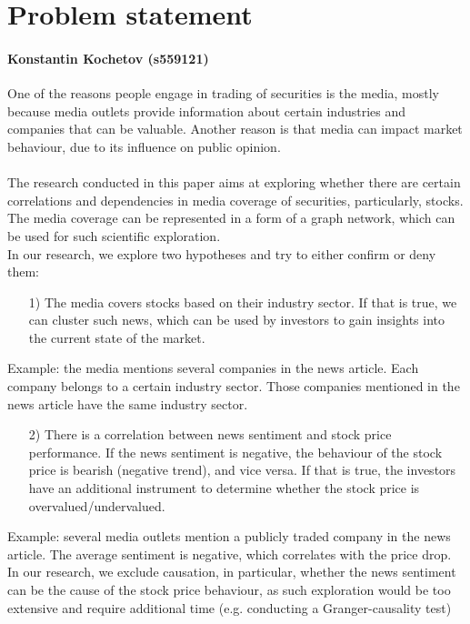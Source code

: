 \chapter{Problem statement}
\subsubsection*{Konstantin Kochetov (s559121)}
\label{cha:problem-statement}

One of the reasons people engage in trading of securities is the media, mostly because media outlets provide information about certain industries and companies that can be valuable. Another reason is that media can impact market behaviour, due to its influence on public opinion.\\
\\
\noindent The research conducted in this paper aims at exploring whether there are certain correlations and dependencies in media coverage of securities, particularly, stocks. The media coverage can be represented in a form of a graph network, which can be used for such scientific exploration.
\\

\noindent In our research, we explore two hypotheses and try to either confirm or deny them:


\begin{itemize}
\item[1)] The media covers stocks based on their industry sector. If that is true, we can cluster such news, which can be used by investors to gain insights into the current state of the market.
\end{itemize}
Example: the media mentions several companies in the news article. Each company belongs to a certain industry sector. Those companies mentioned in the news article have the same industry sector.
\begin{itemize}
\item[2)] There is a correlation between news sentiment and stock price performance. If the news sentiment is negative, the behaviour of the stock price is bearish (negative trend), and vice versa. If that is true, the investors have an additional instrument to determine whether the stock price is overvalued/undervalued.
\end{itemize}
Example: several media outlets mention a publicly traded company in the news article. The average sentiment is negative, which correlates with the price drop.
In our research, we exclude causation, in particular, whether the news sentiment can be the cause of the stock price behaviour, as such exploration would be too extensive and require additional time (e.g. conducting a Granger-causality test)

